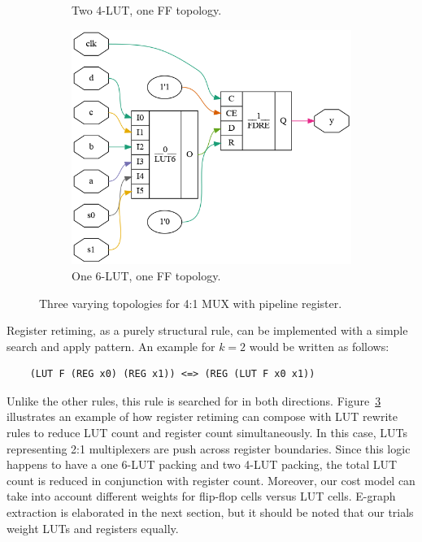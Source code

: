 \begin{figure}[tb]
\begin{subfigure}{0.33\textwidth}
        \caption{Two 4-LUT, one FF topology.}\label{fig:retiming:b}
        \Description[]{}
    \end{subfigure}
    \begin{subfigure}{0.33\textwidth}
        \centering
        \includegraphics[width=\textwidth]{img/mux_4_1_retime.png}
        \caption{One 6-LUT, one FF topology.}\label{fig:retiming:c}
        \Description[]{}
    \end{subfigure}
    \caption{Three varying topologies for 4:1 MUX with pipeline register. }\label{fig:retiming}
    \Description[]{}
\end{figure}

Register retiming, as a purely structural rule, can be implemented with a
simple search and apply pattern. An example for $k=2$ would be written as
follows:

\begin{verbatim}
    (LUT F (REG x0) (REG x1)) <=> (REG (LUT F x0 x1))
\end{verbatim}

Unlike the other rules, this rule is searched for in both directions.
Figure~\ref{fig:retiming} illustrates an example of how register retiming can
compose with LUT rewrite rules to reduce LUT count and register count
simultaneously. In this case, LUTs representing 2:1 multiplexers are push
across register boundaries. Since this logic happens to have a one 6-LUT
packing and two 4-LUT packing, the total LUT count is reduced in conjunction
with register count. Moreover, our cost model can take into account different
weights for flip-flop cells versus LUT cells. E-graph extraction is elaborated
in the next section, but it should be noted that our trials weight LUTs and
registers equally.